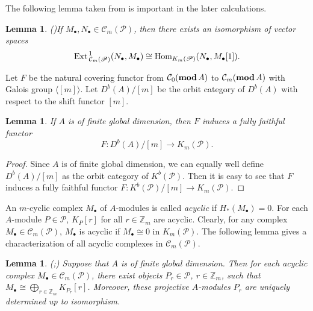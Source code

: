 \documentclass[reqno,12pt]{amsart}
\numberwithin{equation}{section}
\theoremstyle{plain}
\newtheorem{lemma}[theorem]{\bf Lemma}
\theoremstyle{definition}
\begin{document}
The following lemma taken from \cite{ChenD} is important in the later calculations.
\begin{lemma}{\rm(\cite[Lem. 2.5]{ChenD})}\label{Ext to Hom}
If $M_\bullet,N_\bullet \in \mathcal{C}_m(\mathscr{P})$, then there exists an isomorphism of vector spaces $${\mbox{\rm Ext}\,}_{\mathcal{C}_m(\mathscr{P})}^1(N_\bullet,M_\bullet) \cong {\mbox{\rm Hom}}_{K_m(\mathscr{P})}(N_\bullet,M_\bullet[1]).$$
\end{lemma}

Let $F$ be the natural covering functor from $\mathcal{C}_0({\mbox{\rm \textbf{mod}}\,} A)$ to $\mathcal{C}_m({\mbox{\rm \textbf{mod}}\,} A)$ with Galois group ${\langle {[m]}\rangle}$. Let $D^b(A)/[m]$ be the orbit category of $D^b(A)$ with respect to the shift functor $[m]$.

\begin{lemma}
If $A$ is of finite global dimension, then
$F$ induces a fully faithful functor $$F:D^b(A)/[m]\longrightarrow K_m(\mathscr{P}).$$
\end{lemma}
\begin{proof}
Since $A$ is of finite global dimension, we can equally well define $D^b(A)/[m]$ as the orbit category of $K^b(\mathscr{P})$. Then it is easy to see that $F$ induces a fully faithful functor $F:K^b(\mathscr{P})/[m]\longrightarrow K_m(\mathscr{P}).$
\end{proof}
An $m$-cyclic complex $M_\bullet$ of $A$-modules is called \emph{acyclic} if $H_\ast(M_\bullet)=0$.
For each $A$-module $P\in\mathscr{P}$, $K_P[r]$ for all $r\in\mathbb{Z}_m$ are acyclic.
Clearly, for any complex $M_\bullet\in \mathcal{C}_m(\mathscr{P})$, $M_\bullet$ is acyclic if $M_\bullet \cong 0$ in $K_m(\mathscr{P})$.
The following lemma gives a characterization of all acyclic complexes in $\mathcal{C}_m(\mathscr{P})$.

\begin{lemma}{\rm(\cite[Lem. 3.2]{Br};\cite[Lem. 2.2]{ZHC1})}
Suppose that $A$ is of finite global dimension. Then for each acyclic complex $M_\bullet\in \mathcal{C}_m(\mathscr{P})$, there exist objects $P_r\in\mathscr{P}$, $r\in\mathbb{Z}_m$, such that ${{M}_{\bullet }}\cong\underset{r\in\mathbb{Z}_m}\bigoplus K_{P_r}[r]$. Moreover, these projective $A$-modules $P_r$ are uniquely determined up to isomorphism.
\end{lemma}
\end{document}
